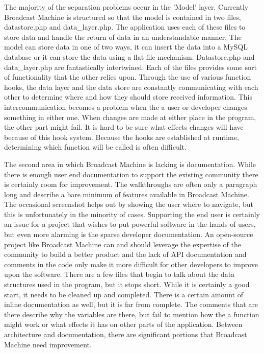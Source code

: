 \documentclass[a4paper,12pt]{report}
\begin{document}
The majority of the separation problems occur in the 'Model' layer.
Currently Broadcast Machine is structured so that the model is contained in two files, datastore.php and data\_layer.php.
The application uses each of these files to store data and handle the return of data in an understandable manner.
The model can store data in one of two ways, it can insert the data into a MySQL database or it can store the data using a flat-file mechanism.
Datastore.php and data\_layer.php are fantastically intertwined.
Each of the files provides some sort of functionality that the other relies upon.
Through the use of various function hooks, the data layer and the data store are constantly communicating with each other to determine where and how they should store received information.
This intercommunication becomes a problem when the a user or developer changes something in either one.
When changes are made at either place in the program, the other part might fail.
It is hard to be sure what effects changes will have because of this hook system.
Because the hooks are established at runtime, determining which function will be called is often difficult.

The second area in which Broadcast Machine is lacking is documentation.
While there is enough user end documentation to support the existing community there is certainly room for improvement.
The walkthroughs are often only a paragraph long and describe a bare minimum of features available in Broadcast Machine.
The occasional screenshot helps out by showing the user where to navigate, but this is unfortunately in the minority of cases.
Supporting the end user is certainly an issue for a project that wishes to put powerful software in the hands of users, but even more alarming is the sparse developer documentation.
An open-source project like Broadcast Machine can and should leverage the expertise of the community to build a better product and the lack of API documentation and comments in the code only make it more difficult for other developers to improve upon the software.
There are a few files that begin to talk about the data structures used in the program, but it stops short.
While it is certainly a good start, it needs to be cleaned up and completed. There is a certain amount of inline documentation as well, but it is far from complete.
The comments that are there describe why the variables are there, but fail to mention how the a function might work or what effects it has on other parts of the application.
Between architecture and documentation, there are significant portions that Broadcast Machine need improvement.
\end{document}
